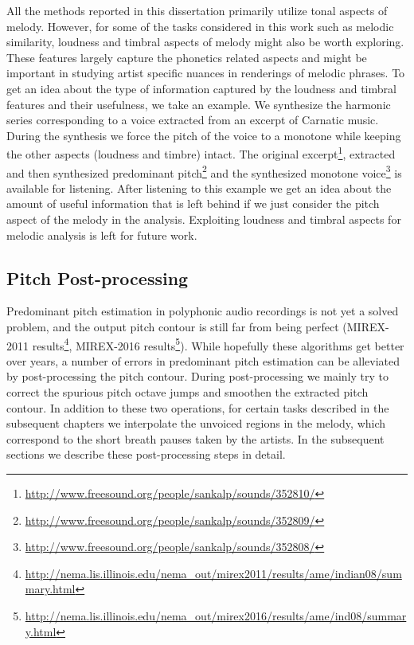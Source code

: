 {All the methods reported in this dissertation primarily utilize tonal aspects of melody. However, for some of the tasks considered in this work such as melodic similarity, loudness and timbral aspects of melody might also be worth exploring. These features largely capture the phonetics related aspects and might be important in studying artist specific nuances in renderings of melodic phrases. To get an idea about the type of information captured by the loudness and timbral features and their usefulness, we take an example. We synthesize the harmonic series corresponding to a voice extracted from an excerpt of Carnatic music. During the synthesis we force the pitch of the voice to a monotone while keeping the other aspects (loudness and timbre) intact. The original excerpt\footnote{\url{http://www.freesound.org/people/sankalp/sounds/352810/}}, extracted and then synthesized predominant pitch\footnote{\url{http://www.freesound.org/people/sankalp/sounds/352809/}} and the synthesized monotone voice\footnote{\url{http://www.freesound.org/people/sankalp/sounds/352808/}} is available for listening. After listening to this example we get an idea about the amount of useful information that is left behind if we just consider the pitch aspect of the melody in the analysis. Exploiting loudness and timbral aspects for melodic analysis is left for future work.



\subsection{Pitch Post-processing}
\label{sec:data_preprocessing_pitch_postprocessing}

Predominant pitch estimation in polyphonic audio recordings is not yet a solved problem, and the output pitch contour is still far from being perfect (MIREX-2011 results\footnote{\url{http://nema.lis.illinois.edu/nema_out/mirex2011/results/ame/indian08/summary.html}}, MIREX-2016 results\footnote{\url{http://nema.lis.illinois.edu/nema_out/mirex2016/results/ame/ind08/summary.html}}). While hopefully these algorithms get better over years, a number of errors in predominant pitch estimation can be alleviated by post-processing the pitch contour. During post-processing we mainly try to correct the spurious pitch octave jumps and smoothen the extracted pitch contour. In addition to these two operations, for certain tasks described in the subsequent chapters we interpolate the unvoiced regions in the melody, which correspond to the short breath pauses taken by the artists. In the subsequent sections we describe these post-processing steps in detail.

}
